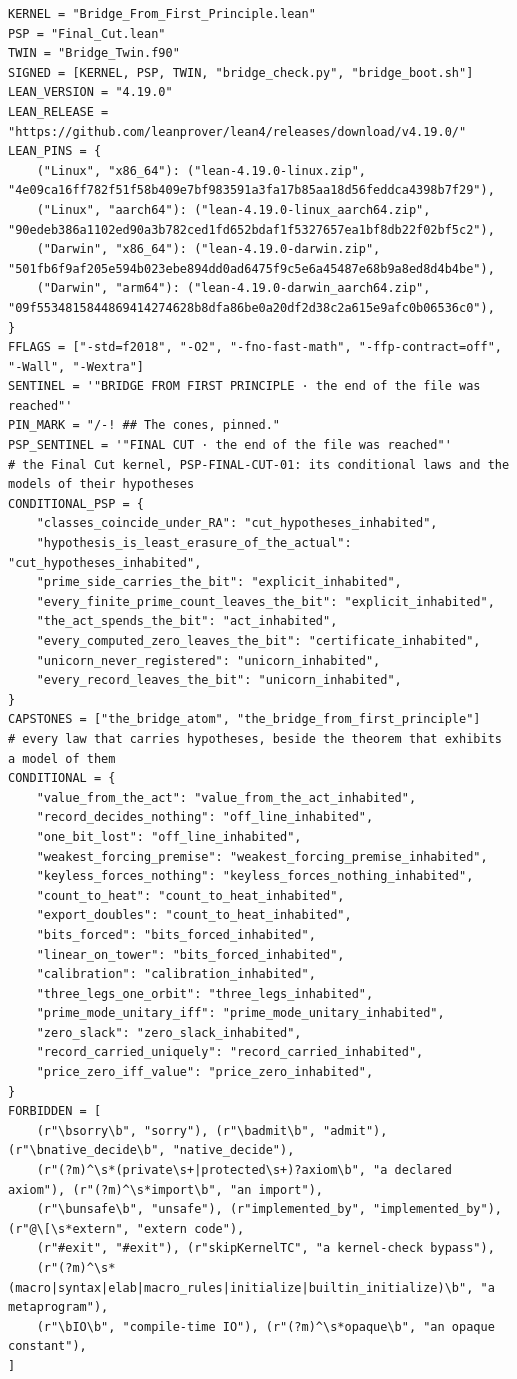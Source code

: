 \documentclass[10pt,twocolumn]{article}
\begin{document}
\begin{Verbatim}
KERNEL = "Bridge_From_First_Principle.lean"
PSP = "Final_Cut.lean"
TWIN = "Bridge_Twin.f90"
SIGNED = [KERNEL, PSP, TWIN, "bridge_check.py", "bridge_boot.sh"]
LEAN_VERSION = "4.19.0"
LEAN_RELEASE = "https://github.com/leanprover/lean4/releases/download/v4.19.0/"
LEAN_PINS = {
    ("Linux", "x86_64"): ("lean-4.19.0-linux.zip", "4e09ca16ff782f51f58b409e7bf983591a3fa17b85aa18d56feddca4398b7f29"),
    ("Linux", "aarch64"): ("lean-4.19.0-linux_aarch64.zip", "90edeb386a1102ed90a3b782ced1fd652bdaf1f5327657ea1bf8db22f02bf5c2"),
    ("Darwin", "x86_64"): ("lean-4.19.0-darwin.zip", "501fb6f9af205e594b023ebe894dd0ad6475f9c5e6a45487e68b9a8ed8d4b4be"),
    ("Darwin", "arm64"): ("lean-4.19.0-darwin_aarch64.zip", "09f5534815844869414274628b8dfa86be0a20df2d38c2a615e9afc0b06536c0"),
}
FFLAGS = ["-std=f2018", "-O2", "-fno-fast-math", "-ffp-contract=off", "-Wall", "-Wextra"]
SENTINEL = '"BRIDGE FROM FIRST PRINCIPLE · the end of the file was reached"'
PIN_MARK = "/-! ## The cones, pinned."
PSP_SENTINEL = '"FINAL CUT · the end of the file was reached"'
# the Final Cut kernel, PSP-FINAL-CUT-01: its conditional laws and the models of their hypotheses
CONDITIONAL_PSP = {
    "classes_coincide_under_RA": "cut_hypotheses_inhabited",
    "hypothesis_is_least_erasure_of_the_actual": "cut_hypotheses_inhabited",
    "prime_side_carries_the_bit": "explicit_inhabited",
    "every_finite_prime_count_leaves_the_bit": "explicit_inhabited",
    "the_act_spends_the_bit": "act_inhabited",
    "every_computed_zero_leaves_the_bit": "certificate_inhabited",
    "unicorn_never_registered": "unicorn_inhabited",
    "every_record_leaves_the_bit": "unicorn_inhabited",
}
CAPSTONES = ["the_bridge_atom", "the_bridge_from_first_principle"]
# every law that carries hypotheses, beside the theorem that exhibits a model of them
CONDITIONAL = {
    "value_from_the_act": "value_from_the_act_inhabited",
    "record_decides_nothing": "off_line_inhabited",
    "one_bit_lost": "off_line_inhabited",
    "weakest_forcing_premise": "weakest_forcing_premise_inhabited",
    "keyless_forces_nothing": "keyless_forces_nothing_inhabited",
    "count_to_heat": "count_to_heat_inhabited",
    "export_doubles": "count_to_heat_inhabited",
    "bits_forced": "bits_forced_inhabited",
    "linear_on_tower": "bits_forced_inhabited",
    "calibration": "calibration_inhabited",
    "three_legs_one_orbit": "three_legs_inhabited",
    "prime_mode_unitary_iff": "prime_mode_unitary_inhabited",
    "zero_slack": "zero_slack_inhabited",
    "record_carried_uniquely": "record_carried_inhabited",
    "price_zero_iff_value": "price_zero_inhabited",
}
FORBIDDEN = [
    (r"\bsorry\b", "sorry"), (r"\badmit\b", "admit"), (r"\bnative_decide\b", "native_decide"),
    (r"(?m)^\s*(private\s+|protected\s+)?axiom\b", "a declared axiom"), (r"(?m)^\s*import\b", "an import"),
    (r"\bunsafe\b", "unsafe"), (r"implemented_by", "implemented_by"), (r"@\[\s*extern", "extern code"),
    (r"#exit", "#exit"), (r"skipKernelTC", "a kernel-check bypass"),
    (r"(?m)^\s*(macro|syntax|elab|macro_rules|initialize|builtin_initialize)\b", "a metaprogram"),
    (r"\bIO\b", "compile-time IO"), (r"(?m)^\s*opaque\b", "an opaque constant"),
]



\end{Verbatim}
\end{document}
